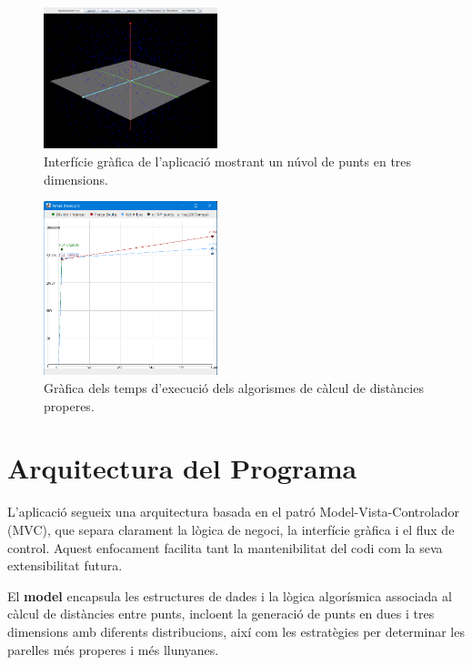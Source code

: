 \documentclass{ieeetj}
\begin{document}
\begin{figure}[htbp]
    \centerline{\includegraphics[width=0.45\textwidth]{docs/png/nuvolPunts3D.png}}
    \caption{Interfície gràfica de l'aplicació mostrant un núvol de punts en tres dimensions.}
    \label{fig:nuvol3D}
\end{figure}

\begin{figure}[htbp]
    \centerline{\includegraphics[width=0.45\textwidth]{docs/png/grafica.png}}
    \caption{Gràfica dels temps d'execució dels algorismes de càlcul de distàncies properes.}
    \label{fig:nuvol3D}
\end{figure}
\section{Arquitectura del Programa}

L’aplicació segueix una arquitectura basada en el patró Model-Vista-Controlador (MVC), que separa clarament la lògica de negoci, la interfície gràfica i el flux de control. Aquest enfocament facilita tant la mantenibilitat del codi com la seva extensibilitat futura.

El \textbf{model} encapsula les estructures de dades i la lògica algorísmica associada al càlcul de distàncies entre punts, incloent la generació de punts en dues i tres dimensions amb diferents distribucions, així com les estratègies per determinar les parelles més properes i més llunyanes.
\end{document}
